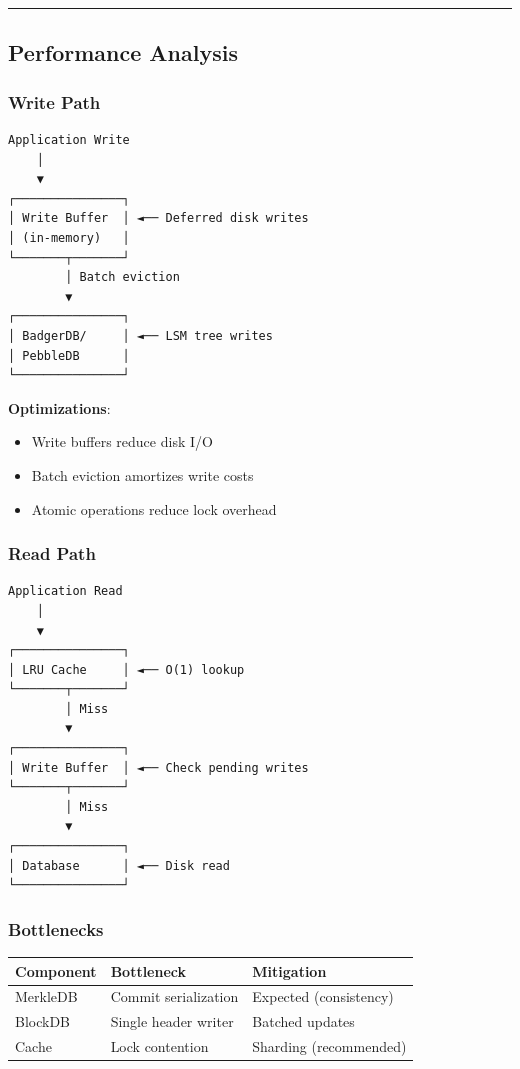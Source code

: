 \documentclass[
]{article}
\newcounter{none} %
\providecommand{\tightlist}{%
  \setlength{\itemsep}{0pt}\setlength{\parskip}{0pt}}
\begin{document}
\begin{center}\rule{0.5\linewidth}{0.5pt}\end{center}

\subsection{Performance Analysis}\label{performance-analysis}

\subsubsection{Write Path}\label{write-path}

\begin{verbatim}
Application Write
    │
    ▼
┌───────────────┐
│ Write Buffer  │ ◄── Deferred disk writes
│ (in-memory)   │
└───────┬───────┘
        │ Batch eviction
        ▼
┌───────────────┐
│ BadgerDB/     │ ◄── LSM tree writes
│ PebbleDB      │
└───────────────┘
\end{verbatim}

\textbf{Optimizations}:

\begin{itemize}
\tightlist
\item
  Write buffers reduce disk I/O
\item
  Batch eviction amortizes write costs
\item
  Atomic operations reduce lock overhead
\end{itemize}

\subsubsection{Read Path}\label{read-path}

\begin{verbatim}
Application Read
    │
    ▼
┌───────────────┐
│ LRU Cache     │ ◄── O(1) lookup
└───────┬───────┘
        │ Miss
        ▼
┌───────────────┐
│ Write Buffer  │ ◄── Check pending writes
└───────┬───────┘
        │ Miss
        ▼
┌───────────────┐
│ Database      │ ◄── Disk read
└───────────────┘
\end{verbatim}

\subsubsection{Bottlenecks}\label{bottlenecks}

{\def\LTcaptype{none} %
\begin{longtable}[]{@{}lll@{}}
\toprule\noalign{}
Component & Bottleneck & Mitigation \\
\midrule\noalign{}
\endhead
\bottomrule\noalign{}
\endlastfoot
MerkleDB & Commit serialization & Expected (consistency) \\
BlockDB & Single header writer & Batched updates \\
Cache & Lock contention & Sharding (recommended) \\
\end{longtable}
}
\end{document}
